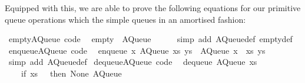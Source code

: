 \begin{isabellebody}
\begin{isamarkuptext}
  Equipped with this, we are able to prove the following equations
  for our primitive queue operations which  the simple
  queues in an amortised fashion:%
\end{isamarkuptext}%
\isamarkuptrue%
%
\isadelimquote
%
\endisadelimquote
%
\isatagquote
{}\isamarkupfalse%
\ empty{}AQueue\ {}code{}{}\isanewline
\ \ {}empty\ {}\ AQueue\ {}{}\ {}{}{}\isanewline
\ \ \isamarkupfalse%
\ {}simp\ add{}\ AQueue{}def\ empty{}def{}\isanewline
\isanewline
{}\isamarkupfalse%
\ enqueue{}AQueue\ {}code{}{}\isanewline
\ \ {}enqueue\ x\ {}AQueue\ xs\ ys{}\ {}\ AQueue\ {}x\ {}\ xs{}\ ys{}\isanewline
\ \ \isamarkupfalse%
\ {}simp\ add{}\ AQueue{}def{}\isanewline
\isanewline
{}\isamarkupfalse%
\ dequeue{}AQueue\ {}code{}{}\isanewline
\ \ {}dequeue\ {}AQueue\ xs\ {}{}{}\ {}\isanewline
\ \ \ \ {}if\ xs\ {}\ {}{}\ then\ {}None{}\ AQueue\ {}{}\ {}{}{}\isanewline

\end{isabellebody}
